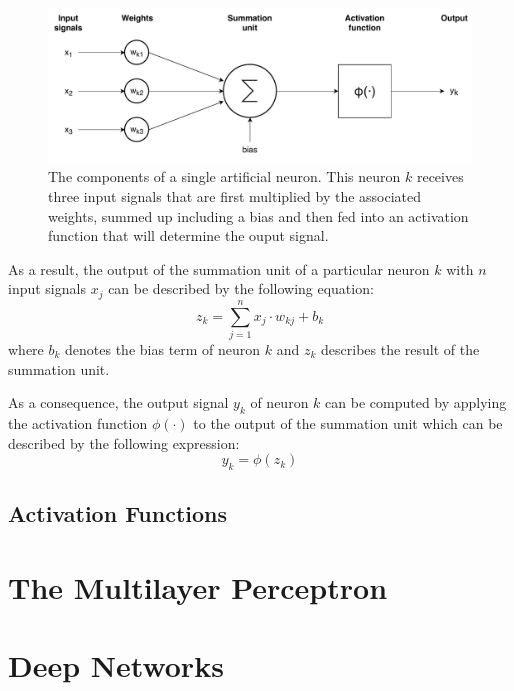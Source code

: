 \begin{figure}[h]
  \centering
  \includegraphics[width=\textwidth]{../figures/single_neuron}
  \caption{The components of a single artificial neuron. This neuron
    \(k\) receives three input signals that are first multiplied by
    the associated weights, summed up including a bias and then fed
    into an activation function that will determine the ouput signal.}
  \label{fig:single-neuron}
\end{figure}
As a result, the output of the summation unit of a particular
neuron \(k\) with \(n\) input signals \(x_j\) can be described by the
following equation:
\begin{equation}
  z_k = \sum_{j=1}^{n}{x_j \cdot w_{kj}} + b_k
\end{equation}
where \(b_k\) denotes the bias term of neuron \(k\) and \(z_k\) describes the
result of the summation unit.

As a consequence, the output signal \(y_k\) of neuron \(k\) can be computed by
applying the activation function \(\phi(\cdot)\) to the output of the
summation unit which can be described by the following expression:
\begin{equation}
  y_k = \phi(z_k)
\end{equation}

\subsection{Activation Functions}
\label{sec:activation-functions}


\section{The Multilayer Perceptron}

\section{Deep Networks}
